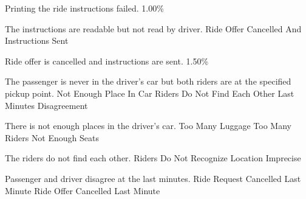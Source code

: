   \startkaosspec
  	 {Printing the ride instructions failed.}
  	 {1.00\%}
  \stopkaosspec
  
  

    {}

  \startkaosspec
  	 {The instructions are readable but not read by driver.}
  	 {Ride Offer Cancelled And Instructions Sent}
  \stopkaosspec

  \startkaosspec
  	 {Ride offer is cancelled and instructions are sent.}
  	 {1.50\%}
  \stopkaosspec
    

    {}
  
  \startkaosspec
  	 {The passenger is never in the driver’s car but both riders are at the specified pickup point.}
  	 {Not Enough Place In Car}
  	 {Riders Do Not Find Each Other}
  	 {Last Minutes Disagreement}
  \stopkaosspec
  
  \startkaosspec
  	 {There is not enough places in the driver’s car.}
  	 {Too Many Luggage}
  	 {Too Many Riders}
  	 {Not Enough Seats}
  \stopkaosspec
  
  \startkaosspec
  	 {The riders do not find each other.}
  	 {Riders Do Not Recognize}
  	 {Location Imprecise}
  \stopkaosspec
  
  \startkaosspec
  	 {Passenger and driver disagree at the last minutes.}
  	 {Ride Request Cancelled Last Minute}
  	 {Ride Offer Cancelled Last Minute}
  \stopkaosspec
  
